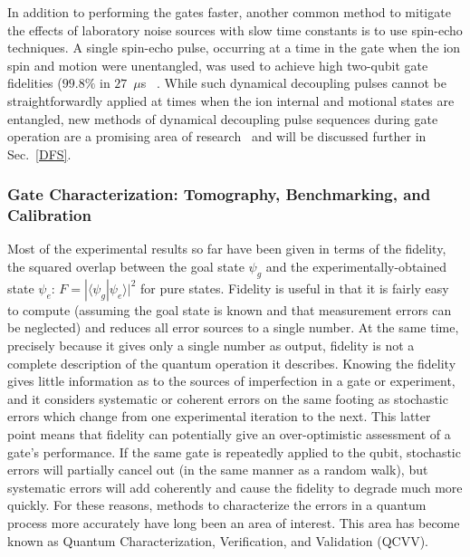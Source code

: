\documentclass[%
12pt,
 amsmath,amssymb,
]{revtex4-2}
\begin{document}
In addition to performing the gates faster, another common method to mitigate the effects of laboratory noise sources with slow time constants is to use spin-echo techniques. A single spin-echo pulse, occurring at a time in the gate when the ion spin and motion were unentangled, was used to achieve high two-qubit gate fidelities ($99.8 \%$ in $27$~$\mu$s~ \cite{BallanceHybridLogic2015}. While such dynamical decoupling pulses cannot be straightforwardly applied at times when the ion internal and motional states are entangled, new methods of dynamical decoupling pulse sequences during gate operation are a promising area of research~\cite{manovitz2017fast} and will be discussed further in Sec.~\ref{DFS}.

    \subsubsection{Gate Characterization: Tomography, Benchmarking, and Calibration}

Most of the experimental results so far have been given in terms of the fidelity, the squared overlap between the goal state $\psi_g$ and the experimentally-obtained state $\psi_e$: $F = | \langle \psi_g | \psi_e \rangle |^2$ for pure states. Fidelity is useful in that it is fairly easy to compute (assuming the goal state is known and that measurement errors can be neglected) and reduces all error sources to a single number. At the same time, precisely because it gives only a single number as output, fidelity is not a complete description of the quantum operation it describes. Knowing the fidelity gives little information as to the sources of imperfection in a gate or experiment, and it considers systematic or coherent errors on the same footing as stochastic errors which change from one experimental iteration to the next. This latter point means that fidelity can potentially give an over-optimistic assessment of a gate's performance. If the same gate is repeatedly applied to the qubit, stochastic errors will partially cancel out (in the same manner as a random walk), but systematic errors will add coherently and cause the fidelity to degrade much more quickly. For these reasons, methods to characterize the errors in a quantum process more accurately have long been an area of interest. This area has become known as Quantum Characterization, Verification, and Validation (QCVV).
\end{document}

